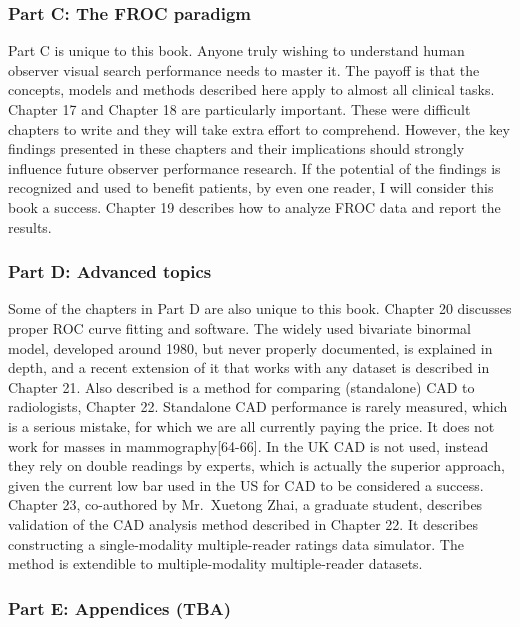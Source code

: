 \documentclass[
]{book}
\begin{document}
\hypertarget{part-c-the-froc-paradigm}{%
\subsubsection{Part C: The FROC paradigm}\label{part-c-the-froc-paradigm}}

Part C is unique to this book. Anyone truly wishing to understand human observer visual search performance needs to master it. The payoff is that the concepts, models and methods described here apply to almost all clinical tasks. Chapter 17 and Chapter 18 are particularly important. These were difficult chapters to write and they will take extra effort to comprehend. However, the key findings presented in these chapters and their implications should strongly influence future observer performance research. If the potential of the findings is recognized and used to benefit patients, by even one reader, I will consider this book a success. Chapter 19 describes how to analyze FROC data and report the results.

\hypertarget{part-d-advanced-topics}{%
\subsubsection{Part D: Advanced topics}\label{part-d-advanced-topics}}

Some of the chapters in Part D are also unique to this book. Chapter 20 discusses proper ROC curve fitting and software. The widely used bivariate binormal model, developed around 1980, but never properly documented, is explained in depth, and a recent extension of it that works with any dataset is described in Chapter 21. Also described is a method for comparing (standalone) CAD to radiologists, Chapter 22. Standalone CAD performance is rarely measured, which is a serious mistake, for which we are all currently paying the price. It does not work for masses in mammography{[}64-66{]}. In the UK CAD is not used, instead they rely on double readings by experts, which is actually the superior approach, given the current low bar used in the US for CAD to be considered a success. Chapter 23, co-authored by Mr.~Xuetong Zhai, a graduate student, describes validation of the CAD analysis method described in Chapter 22. It describes constructing a single-modality multiple-reader ratings data simulator. The method is extendible to multiple-modality multiple-reader datasets.

\hypertarget{part-e-appendices-tba}{%
\subsubsection{Part E: Appendices (TBA)}\label{part-e-appendices-tba}}
\end{document}
